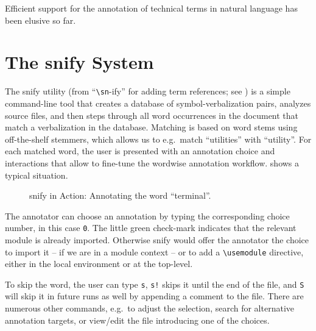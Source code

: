 \documentclass{llncs}
\newcommand\snify{\textsf{snify}\xspace}
\begin{document}
Efficient support for the annotation of technical terms in natural language
has been elusive so far.


\section{The \snify System}\label{sec:snify}

The \snify utility (from ``\texttt{\textbackslash sn}-ify'' for adding term references;
see \cite{stextools:git}) is a simple command-line tool that creates a database of
symbol-verbalization pairs, analyzes \sTeX source files, and then steps through all word
occurrences in the document that match a verbalization in the database.  Matching is based
on word stems using off-the-shelf stemmers, which allows us to e.g.\ match ``utilities''
with ``utility''.  For each matched word, the user is presented with an annotation choice
and interactions that allow to fine-tune the wordwise annotation
workflow.  shows a typical situation.

\begin{figure}[ht]
  \setlength{\fboxsep}{0pt}
  \caption{\snify in Action: Annotating the word ``terminal''.}\label{fig:snify}
\end{figure}

The annotator can choose an annotation by typing the corresponding choice number,
in this case \lstinline|0|.
The little green check-mark indicates that the relevant module is already imported.
Otherwise \snify would offer the annotator the choice to import it -- if we are
in a module context -- or to add a \lstinline|\usemodule| directive, either in the
local environment or at the top-level.

To skip the word, the user can type \lstinline|s|,
\lstinline|s!| skips it until the end of the file, and \lstinline|S|
will skip it in future runs as well by appending a comment to the file.
There are numerous other commands, e.g.\ to adjust the selection,
search for alternative annotation targets,
or view/edit the file introducing one of the choices.
\end{document}
